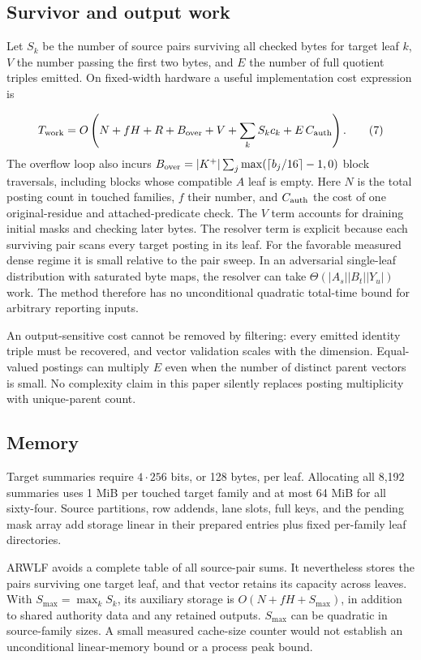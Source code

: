 \documentclass[manuscript,screen,review]{acmart}
\begin{document}
\subsection{Survivor and output work}
Let $S_k$ be the number of source pairs surviving all checked bytes for target leaf $k$, $V$ the number passing the first two bytes, and $E$ the number of full quotient triples emitted. On fixed-width hardware a useful implementation cost expression is

\begin{equation*}
T_{\rm work}=O\left(N+fH+R+B_{\rm over}+V+\sum_k S_kc_k+E\,C_{\rm auth}\right). \tag{7}
\end{equation*}
The overflow loop also incurs $B_{\rm over}=|K^+|\sum_j\max(\lceil b_j/16\rceil-1,0)$ block traversals, including blocks whose compatible $A$ leaf is empty. Here $N$ is the total posting count in touched families, $f$ their number, and $C_{\rm auth}$ the cost of one original-residue and attached-predicate check. The $V$ term accounts for draining initial masks and checking later bytes. The resolver term is explicit because each surviving pair scans every target posting in its leaf. For the favorable measured dense regime it is small relative to the pair sweep. In an adversarial single-leaf distribution with saturated byte maps, the resolver can take $\Theta(|A_s||B_t||Y_u|)$ work. The method therefore has no unconditional quadratic total-time bound for arbitrary reporting inputs.

An output-sensitive cost cannot be removed by filtering: every emitted identity triple must be recovered, and vector validation scales with the dimension. Equal-valued postings can multiply $E$ even when the number of distinct parent vectors is small. No complexity claim in this paper silently replaces posting multiplicity with unique-parent count.

\subsection{Memory}
Target summaries require $4\cdot256$ bits, or 128 bytes, per leaf. Allocating all 8,192 summaries uses 1 MiB per touched target family and at most 64 MiB for all sixty-four. Source partitions, row addends, lane slots, full keys, and the pending mask array add storage linear in their prepared entries plus fixed per-family leaf directories.

ARWLF avoids a complete table of all source-pair sums. It nevertheless stores the pairs surviving one target leaf, and that vector retains its capacity across leaves. With $S_{\max}=\max_k S_k$, its auxiliary storage is $O(N+fH+S_{\max})$, in addition to shared authority data and any retained outputs. $S_{\max}$ can be quadratic in source-family sizes. A small measured cache-size counter would not establish an unconditional linear-memory bound or a process peak bound.
\end{document}
